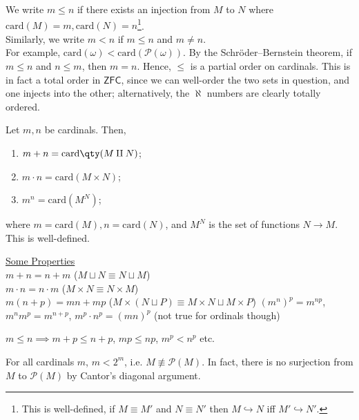 We write $m \leq n$ if there exists an injection from $M$ to $N$ where $\mathrm{card}(M) = m, \mathrm{card}(N) = n$\footnote{This is well-defined, if $M \equiv M'$ and $N \equiv N'$ then $M \hookrightarrow N$ iff $M' \hookrightarrow N'$.}. \\
Similarly, we write $m < n$ if $m \leq n$ and $m \neq n$. \\
For example, $\mathrm{card}(\omega) < \mathrm{card}(\mathcal P(\omega))$.
By the Schr\"oder--Bernstein theorem, if $m \leq n$ and $n \leq m$, then $m = n$.
Hence, $\leq$ is a partial order on cardinals.
This is in fact a total order in $\mathsf{ZFC}$, since we can well-order the two sets in question, and one injects into the other; alternatively, the $\aleph$ numbers are clearly totally ordered.

Let $m, n$ be cardinals.
Then,
\begin{enumerate}
    \item $m + n = \mathrm{card}\qty(M \amalg N)$;
    \item $m \cdot n = \mathrm{card}(M \times N)$;
    \item $m^n = \mathrm{card}(M^N)$;
\end{enumerate}
where $m = \mathrm{card}(M), n = \mathrm{card}(N)$, and $M^N$ is the set of functions $N \to M$.
This is well-defined.

\underline{Some Properties} \\
$m + n = n + m$ ($M \sqcup N \equiv N \sqcup M$) \\
$m \cdot n = n \cdot m$ ($M \times N \equiv N \times M$) \\
$m (n + p) = mn + mp$ ($M \times (N \sqcup P) \equiv M \times N \sqcup M \times P$)
$(m^n)^p = m^{np}$, $m^n m^p = m^{n + p}$, $m^p \cdot n^p = (mn)^p$ (not true for ordinals though)

$m \leq n \implies m + p \leq n + p$, $mp \leq np$, $m^p < n^p$ etc.

\begin{note}
    For all cardinals $m$, $m < 2^m$, i.e. $M \not\equiv \mathcal{P}(M)$.
    In fact, there is no surjection from $M$ to $\mathcal{P}(M)$ by Cantor's diagonal argument.
\end{note}


